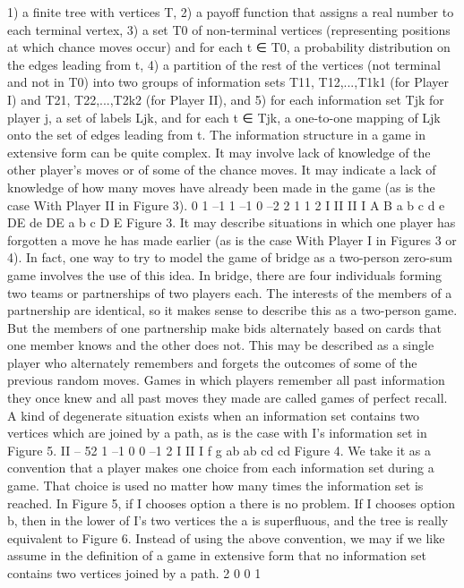 1) a finite tree with vertices T,
2) a payoff function that assigns a real number to each terminal vertex,
3) a set T0 of non-terminal vertices (representing positions at which chance moves
occur) and for each t ∈ T0, a probability distribution on the edges leading from t,
4) a partition of the rest of the vertices (not terminal and not in T0) into two groups
of information sets T11, T12,...,T1k1 (for Player I) and T21, T22,...,T2k2 (for Player II),
and
5) for each information set Tjk for player j, a set of labels Ljk, and for each t ∈ Tjk,
a one-to-one mapping of Ljk onto the set of edges leading from t.
The information structure in a game in extensive form can be quite complex. It may
involve lack of knowledge of the other player’s moves or of some of the chance moves. It
may indicate a lack of knowledge of how many moves have already been made in the game
(as is the case With Player II in Figure 3).
0
1 –1 1 –1 0 –2 2 1
1 2
I
II II
I
A B
a b c d
e
DE de DE a b c
D E
Figure 3.
It may describe situations in which one player has forgotten a move he has made
earlier (as is the case With Player I in Figures 3 or 4). In fact, one way to try to model
the game of bridge as a two-person zero-sum game involves the use of this idea. In bridge,
there are four individuals forming two teams or partnerships of two players each. The
interests of the members of a partnership are identical, so it makes sense to describe this
as a two-person game. But the members of one partnership make bids alternately based
on cards that one member knows and the other does not. This may be described as a
single player who alternately remembers and forgets the outcomes of some of the previous
random moves. Games in which players remember all past information they once knew
and all past moves they made are called games of perfect recall.
A kind of degenerate situation exists when an information set contains two vertices
which are joined by a path, as is the case with I’s information set in Figure 5.
II – 52
1
–1 0 0 –1
2
I
II
I
f g
ab ab
cd cd
Figure 4.
We take it as a convention that a player makes one choice from each information set
during a game. That choice is used no matter how many times the information set is
reached. In Figure 5, if I chooses option a there is no problem. If I chooses option b, then
in the lower of I’s two vertices the a is superfluous, and the tree is really equivalent to
Figure 6. Instead of using the above convention, we may if we like assume in the definition
of a game in extensive form that no information set contains two vertices joined by a path.
2 0
0 1
